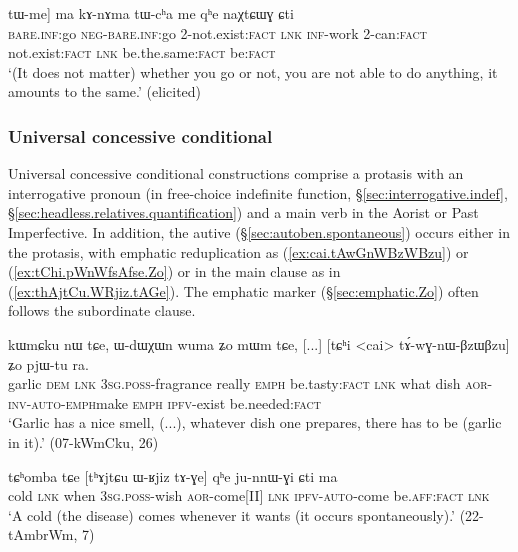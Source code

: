 \begin{exe}
\ex  \label{ex:Ce.mACe.tWme}
\gll [[ɕe] [mɤ-ɕe] tɯ-me] ma kɤ-nɤma tɯ-cʰa me qʰe naχtɕɯɣ ɕti\\
\textsc{bare}.\textsc{inf}:go \textsc{neg}-\textsc{bare}.\textsc{inf}:go 2-not.exist:\textsc{fact} \textsc{lnk} \textsc{inf}-work 2-can:\textsc{fact} not.exist:\textsc{fact} \textsc{lnk} be.the.same:\textsc{fact} be:\textsc{fact} \\
\glt `(It does not matter) whether you go or not, you are not able to do anything, it amounts to the same.' (elicited)
\end{exe}

\subsubsection{Universal concessive conditional} \label{sec:universal.concessive.conditional}
Universal concessive conditional constructions comprise a protasis with an interrogative pronoun (in free-choice indefinite function, §\ref{sec:interrogative.indef}, §\ref{sec:headless.relatives.quantification}) and a main verb in the Aorist or Past Imperfective. In addition, the autive (§\ref{sec:autoben.spontaneous}) occurs either in the protasis, with emphatic reduplication as (\ref{ex:cai.tAwGnWBzWBzu}) or (\ref{ex:tChi.pWnWfsAfse.Zo}) or in the main clause as in (\ref{ex:thAjtCu.WRjiz.tAGe}). The emphatic marker  (§\ref{sec:emphatic.Zo}) often follows the subordinate clause.


\begin{exe}
\ex \label{ex:cai.tAwGnWBzWBzu}
\gll kɯmɕku nɯ tɕe, ɯ-dɯχɯn wuma ʑo mɯm tɕe, [...]  [tɕʰi <cai> tɤ́-wɣ-nɯ-βzɯ\redp{}βzu] ʑo pjɯ-tu ra. \\
garlic \textsc{dem} \textsc{lnk} \textsc{3sg}.\textsc{poss}-fragrance really \textsc{emph} be.tasty:\textsc{fact} \textsc{lnk} { } what dish \textsc{aor}-\textsc{inv}-\textsc{auto}-\textsc{emph}\redp{}make \textsc{emph} \textsc{ipfv}-exist  be.needed:\textsc{fact} \\
\glt `Garlic has a nice smell, (...), whatever dish one prepares, there has to be (garlic in it).' (07-kWmCku, 26)
\end{exe}

 \begin{exe}
\ex \label{ex:thAjtCu.WRjiz.tAGe}
\gll  tɕʰomba tɕe [tʰɤjtɕu ɯ-ʁjiz tɤ-ɣe] qʰe ju-nnɯ-ɣi ɕti ma \\
cold \textsc{lnk} when \textsc{3sg}.\textsc{poss}-wish \textsc{aor}-come[II] \textsc{lnk} \textsc{ipfv}-\textsc{auto}-come be.\textsc{aff}:\textsc{fact} \textsc{lnk} \\
\glt `A cold (the disease) comes whenever it wants (it occurs spontaneously).' (22-tAmbrWm, 7)
\end{exe}

